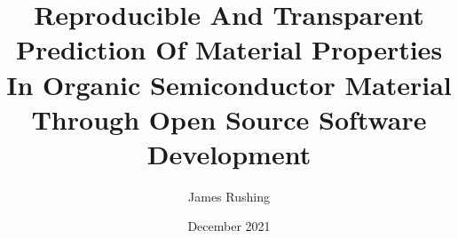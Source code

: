 \documentclass[12pt]{report}
\begin{document}
\author{James Rushing}
\title{Reproducible And Transparent Prediction Of Material Properties
In Organic Semiconductor Material Through Open Source Software Development} %
\date{December 2021}
\maketitle
\makecopyright
\submittalsheet
\setcounter{page}{4}
%

%

\tableofcontents
\end{document}
